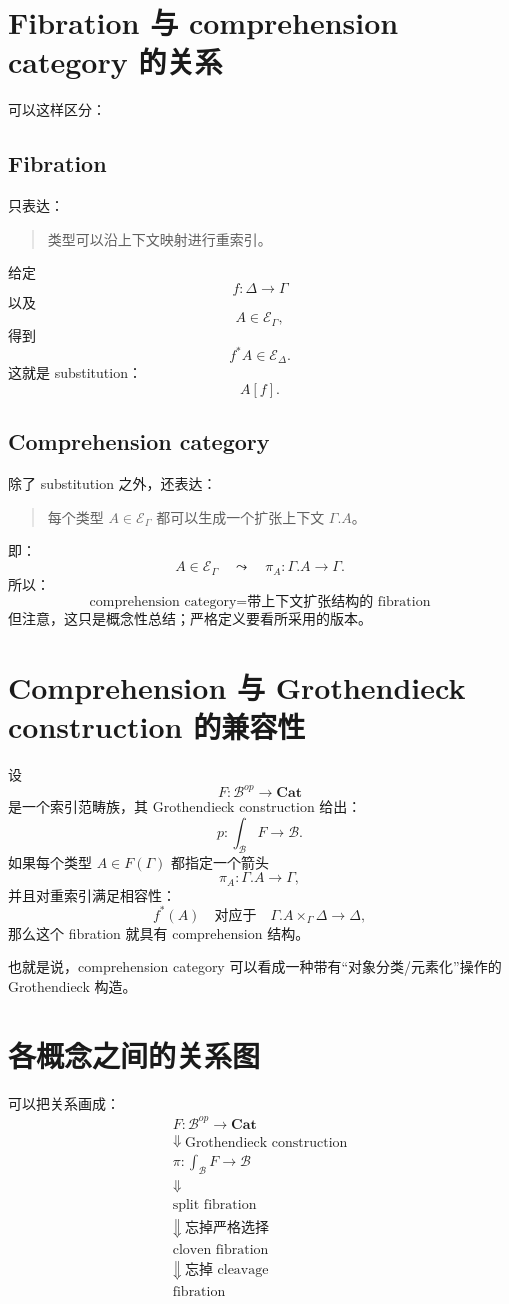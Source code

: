 \documentclass[12pt,a4paper]{article}
\begin{document}
\section{Fibration 与 comprehension category 的关系}

可以这样区分：

\subsection{Fibration}
只表达：
\begin{quote}
类型可以沿上下文映射进行重索引。
\end{quote}
给定
\[
f:\Delta\to\Gamma
\]
以及
\[
A\in\mathcal{E}_\Gamma,
\]
得到
\[
f^*A\in\mathcal{E}_\Delta.
\]
这就是 substitution：
\[
A[\!f\!].
\]

\subsection{Comprehension category}
除了 substitution 之外，还表达：
\begin{quote}
每个类型 \(A\in\mathcal{E}_\Gamma\) 都可以生成一个扩张上下文 \(\Gamma.A\)。
\end{quote}
即：
\[
A\in\mathcal{E}_\Gamma
\quad\leadsto\quad
\pi_A:\Gamma.A\to\Gamma.
\]
所以：
\[
\boxed{
\text{comprehension category}
=
\text{带上下文扩张结构的 fibration}
}
\]
但注意，这只是概念性总结；严格定义要看所采用的版本。

\section{Comprehension 与 Grothendieck construction 的兼容性}

设
\[
F:\mathcal{B}^{op}\to\mathbf{Cat}
\]
是一个索引范畴族，其 Grothendieck construction 给出：
\[
p:\int_{\mathcal{B}}F\to\mathcal{B}.
\]
如果每个类型 \(A\in F(\Gamma)\) 都指定一个箭头
\[
\pi_A:\Gamma.A\to\Gamma,
\]
并且对重索引满足相容性：
\[
f^*(A)
\quad\text{对应于}\quad
\Gamma.A\times_\Gamma\Delta\to\Delta,
\]
那么这个 fibration 就具有 comprehension 结构。

也就是说，comprehension category 可以看成一种带有“对象分类/元素化”操作的 Grothendieck 构造。

\section{各概念之间的关系图}

可以把关系画成：
\[
\begin{array}{c}
F:\mathcal{B}^{op}\to\mathbf{Cat}
\\[2mm]
\Downarrow\ \text{Grothendieck construction}
\\[2mm]
\pi:\int_{\mathcal{B}}F\to\mathcal{B}
\\[2mm]
\Downarrow
\\[2mm]
\text{split fibration}
\\[2mm]
\Downarrow\ \text{忘掉严格选择}
\\[2mm]
\text{cloven fibration}
\\[2mm]
\Downarrow\ \text{忘掉 cleavage}
\\[2mm]
\text{fibration}
\end{array}
\]
\end{document}
